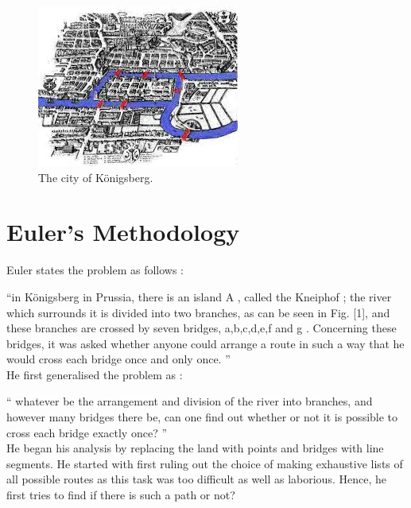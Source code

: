 \documentclass[acmsmall]{acmart}
\begin{document}
\begin{figure}[h]
  \centering
  \includegraphics[width=\linewidth]{koncity}
  \caption{The city of Königsberg.}
\end{figure}



\section{Euler's Methodology}

Euler states the problem as follows :

“in Königsberg in Prussia, there is an island A , called the Kneiphof ; the river which surrounds it is
divided into two branches, as can be seen in Fig. [1], and these branches are crossed by seven bridges,
a,b,c,d,e,f and g . Concerning these bridges, it was asked whether anyone could arrange a route in such a
way that he would cross each bridge once and only once. ”\\


He first generalised the problem as :

“ whatever be the arrangement and division of the river into branches, and however many bridges there be,
can one find out whether or not it is possible to cross each bridge exactly once? ”\\


He began his analysis by replacing the land with points and bridges with line segments. He
started with first ruling out the choice of making exhaustive lists of all possible routes as this task was too difficult as well as laborious. Hence, he first tries to find if there is such a path or not?\\
\end{document}
